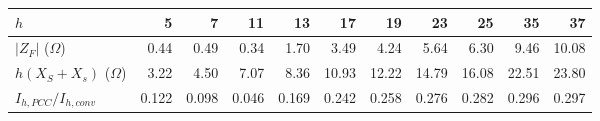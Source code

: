 \begin{tabular}{lrrrrrrrrrr}
\toprule
$h$ & 5 & 7 & 11 & 13 & 17 & 19 & 23 & 25 & 35 & 37\\
\midrule
$|Z_F|$ ($\Omega$) & 0.44 & 0.49 & 0.34 & 1.70 & 3.49 & 4.24 & 5.64 & 6.30 & 9.46 & 10.08\\
$h(X_S+X_s)$ ($\Omega$) & 3.22 & 4.50 & 7.07 & 8.36 & 10.93 & 12.22 & 14.79 & 16.08 & 22.51 & 23.80\\
$I_{h,PCC}/I_{h,conv}$ & 0.122 & 0.098 & 0.046 & 0.169 & 0.242 & 0.258 & 0.276 & 0.282 & 0.296 & 0.297\\
\bottomrule
\end{tabular}
